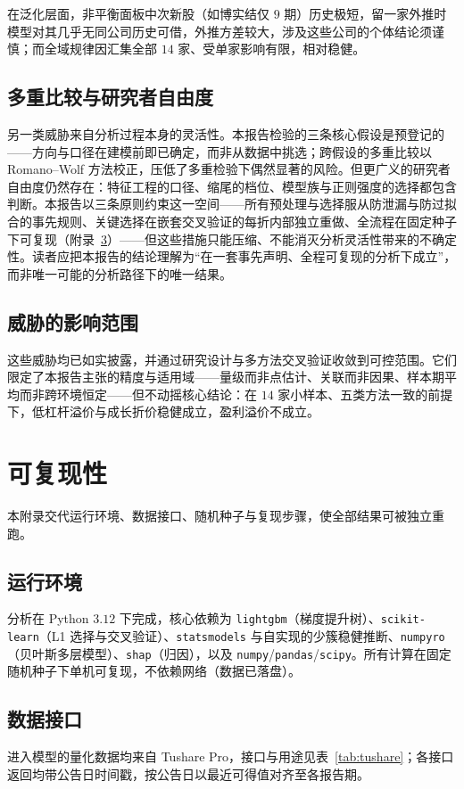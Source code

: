 \documentclass[UTF8, a4paper, fontset=none, zihao=-4]{ctexrep}
\begin{document}
在泛化层面，非平衡面板中次新股（如博实结仅 $9$ 期）历史极短，留一家外推时模型对其几乎无同公司历史可借，外推方差较大，涉及这些公司的个体结论须谨慎；而全域规律因汇集全部 $14$ 家、受单家影响有限，相对稳健。

\section{多重比较与研究者自由度}
另一类威胁来自分析过程本身的灵活性。本报告检验的三条核心假设是预登记的——方向与口径在建模前即已确定，而非从数据中挑选；跨假设的多重比较以 Romano--Wolf 方法校正，压低了多重检验下偶然显著的风险。但更广义的研究者自由度仍然存在：特征工程的口径、缩尾的档位、模型族与正则强度的选择都包含判断。本报告以三条原则约束这一空间——所有预处理与选择服从防泄漏与防过拟合的事先规则、关键选择在嵌套交叉验证的每折内部独立重做、全流程在固定种子下可复现（附录~\ref{app:repro}）——但这些措施只能压缩、不能消灭分析灵活性带来的不确定性。读者应把本报告的结论理解为“在一套事先声明、全程可复现的分析下成立”，而非唯一可能的分析路径下的唯一结果。

\section{威胁的影响范围}
这些威胁均已如实披露，并通过研究设计与多方法交叉验证收敛到可控范围。它们限定了本报告主张的精度与适用域——量级而非点估计、关联而非因果、样本期平均而非跨环境恒定——但不动摇核心结论：在 $14$ 家小样本、五类方法一致的前提下，低杠杆溢价与成长折价稳健成立，盈利溢价不成立。

\appendix
\chapter{可复现性}\label{app:repro}
本附录交代运行环境、数据接口、随机种子与复现步骤，使全部结果可被独立重跑。

\section{运行环境}
分析在 Python $3.12$ 下完成，核心依赖为 \texttt{lightgbm}（梯度提升树）、\texttt{scikit-learn}（L1 选择与交叉验证）、\texttt{statsmodels} 与自实现的少簇稳健推断、\texttt{numpyro}（贝叶斯多层模型）、\texttt{shap}（归因），以及 \texttt{numpy}/\texttt{pandas}/\texttt{scipy}。所有计算在固定随机种子下单机可复现，不依赖网络（数据已落盘）。

\section{数据接口}
进入模型的量化数据均来自 Tushare Pro，接口与用途见表~\ref{tab:tushare}；各接口返回均带公告日时间戳，按公告日以最近可得值对齐至各报告期。
\end{document}
